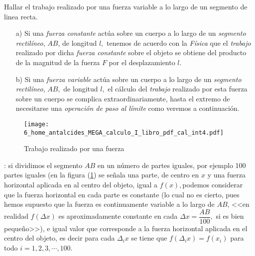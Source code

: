 \begin{problema}\label{prob:pro4} 

Hallar el trabajo realizado por una fuerza variable a lo largo de
un segmento de linea recta.

\end{problema}

\begin{solucion}
\begin{enumerate}
\item[a)]  Si una \textsl{fuerza constante} actúa sobre un cuerpo a lo largo
de un \textsl{segmento rectilíneo}, $AB$, de longitud $l,$ tenemos
de acuerdo con la \textsl{Física} que el \textsl{trabajo} realizado
por dicha \textsl{fuerza constante} sobre el objeto se obtiene del
producto de la magnitud de la fuerza $F$ por el desplazamiento $l.$
\item[b)]  Si una \textsl{fuerza variable} actúa sobre un cuerpo a lo largo
de un \textsl{segmento rectilíneo}, $AB,$ de longitud $l,$ el cálculo
del \textsl{trabajo} realizado por esta fuerza sobre un cuerpo se
complica extraordinariamente, hasta el extremo de necesitarse una
\textsl{operación de paso al límite} como veremos a continuación.
\end{enumerate}
\begin{figure}[H]
\centering\texttt{[image: 6\_home\_antalcides\_MEGA\_calculo\_I\_libro\_pdf\_cal\_int4.pdf]}\caption{Trabajo realizado por una fuerza}\label{fig:fig4}
\end{figure}

\vspace*{2pt}\begin{nota}\peque

\emph{}: si dividimos el segmento $AB$ en un número
de partes iguales, por ejemplo 100 partes iguales (en la figura (\ref{fig:fig4})
se señala una parte, de centro en $x$ y una fuerza horizontal aplicada
en al centro del objeto, igual a $f\left(x\right),$podemos considerar
que la fuerza horizontal en cada parte es constante (lo cual no es
cierto, pues hemos supuesto que la fuerza es continuamente variable
a lo largo de $AB$, <<en realidad $f\left(\Delta x\right)$ es aproximadamente
constante en cada $\Delta x=\dfrac{AB}{100},$ si es bien pequeño>>),
e igual valor que corresponde a la fuerza horizontal aplicada en el
centro del objeto, es decir para cada $\Delta_{i}x$ se tiene que
$f\left(\Delta_{i}x\right)=f\left(x_{i}\right)$ para todo $i=1,2,3,\cdots,100$.


\end{nota}
\end{solucion}
